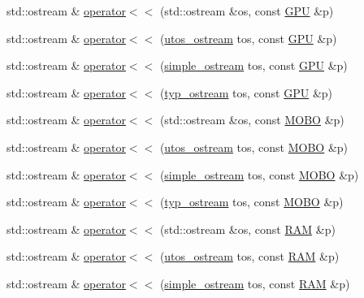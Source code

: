\begin{DoxyCompactItemize}
\item 
std\+::ostream \& \mbox{\hyperlink{_parts_8cpp_a7b20bb2c543e3b9a7b73e788908a818d}{operator$<$$<$}} (std\+::ostream \&os, const \mbox{\hyperlink{class_g_p_u}{G\+PU}} \&p)
\item 
std\+::ostream \& \mbox{\hyperlink{_parts_8cpp_aef9dc14f6e2f85d7d17c9d333b496940}{operator$<$$<$}} (\mbox{\hyperlink{structutos__ostream}{utos\+\_\+ostream}} tos, const \mbox{\hyperlink{class_g_p_u}{G\+PU}} \&p)
\item 
std\+::ostream \& \mbox{\hyperlink{_parts_8cpp_abff1a939f566e5221c8e27c6f5f1e75f}{operator$<$$<$}} (\mbox{\hyperlink{structsimple__ostream}{simple\+\_\+ostream}} tos, const \mbox{\hyperlink{class_g_p_u}{G\+PU}} \&p)
\item 
std\+::ostream \& \mbox{\hyperlink{_parts_8cpp_a2588ec78daf227593680dcc1518e07e5}{operator$<$$<$}} (\mbox{\hyperlink{structtyp__ostream}{typ\+\_\+ostream}} tos, const \mbox{\hyperlink{class_g_p_u}{G\+PU}} \&p)
\item 
std\+::ostream \& \mbox{\hyperlink{_parts_8cpp_a2692dd3fd4bb8169a98820ed4cb9e018}{operator$<$$<$}} (std\+::ostream \&os, const \mbox{\hyperlink{class_m_o_b_o}{M\+O\+BO}} \&p)
\item 
std\+::ostream \& \mbox{\hyperlink{_parts_8cpp_a910424cdc7f138e807c1f067a09fc0e6}{operator$<$$<$}} (\mbox{\hyperlink{structutos__ostream}{utos\+\_\+ostream}} tos, const \mbox{\hyperlink{class_m_o_b_o}{M\+O\+BO}} \&p)
\item 
std\+::ostream \& \mbox{\hyperlink{_parts_8cpp_a43042e9afeb381af0407fac8224323b0}{operator$<$$<$}} (\mbox{\hyperlink{structsimple__ostream}{simple\+\_\+ostream}} tos, const \mbox{\hyperlink{class_m_o_b_o}{M\+O\+BO}} \&p)
\item 
std\+::ostream \& \mbox{\hyperlink{_parts_8cpp_aee2d92df2f9b6f397f7dc9ba4ff4372d}{operator$<$$<$}} (\mbox{\hyperlink{structtyp__ostream}{typ\+\_\+ostream}} tos, const \mbox{\hyperlink{class_m_o_b_o}{M\+O\+BO}} \&p)
\item 
std\+::ostream \& \mbox{\hyperlink{_parts_8cpp_a6fdebbd47f8bac238a905dc2cc26f16d}{operator$<$$<$}} (std\+::ostream \&os, const \mbox{\hyperlink{class_r_a_m}{R\+AM}} \&p)
\item 
std\+::ostream \& \mbox{\hyperlink{_parts_8cpp_a9c26b4bc6e7ef6ecfc579c223a3ba7b8}{operator$<$$<$}} (\mbox{\hyperlink{structutos__ostream}{utos\+\_\+ostream}} tos, const \mbox{\hyperlink{class_r_a_m}{R\+AM}} \&p)
\item 
std\+::ostream \& \mbox{\hyperlink{_parts_8cpp_a064584bf28a5db5005fa6cd5609571a3}{operator$<$$<$}} (\mbox{\hyperlink{structsimple__ostream}{simple\+\_\+ostream}} tos, const \mbox{\hyperlink{class_r_a_m}{R\+AM}} \&p)

\end{DoxyCompactItemize}
